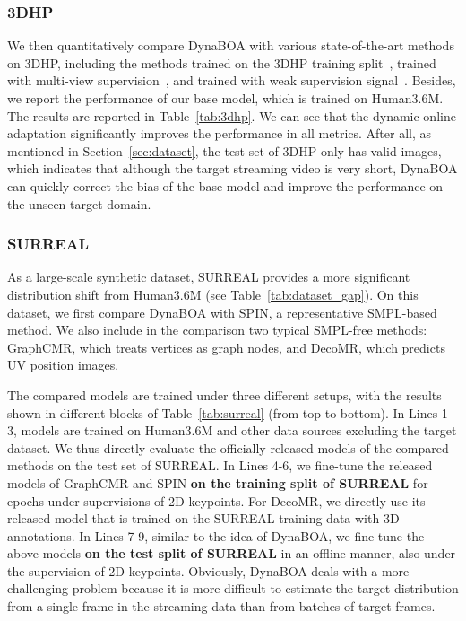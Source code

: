 \documentclass[10pt,journal,compsoc]{IEEEtran}
\newcommand{\sect}[1]{Section~\ref{#1}}
\newcommand{\tab}[1]{Table~\ref{#1}}
\begin{document}
\subsubsection{3DHP} 
We then quantitatively compare DynaBOA with various state-of-the-art methods on 3DHP, including the methods trained on the 3DHP training split~\cite{mehta2017monocular,mehta2017vnect,kocabas2019self,kanazawa2018end,kolotouros2019learning}, trained with multi-view supervision~\cite{kocabas2019self}, and trained with weak supervision signal~\cite{zhou2017towards,habibie2019wild}.
Besides, we report the performance of our base model, which is trained on Human3.6M. The results are reported in \tab{tab:3dhp}. 
We can see that the dynamic online adaptation significantly improves the performance in all metrics. 
After all, as mentioned in \sect{sec:dataset}, the test set of 3DHP only has  valid images, which indicates that although the target streaming video is very short, DynaBOA can quickly correct the bias of the base model and improve the performance on the unseen target domain.


\subsubsection{SURREAL}
As a large-scale synthetic dataset, SURREAL provides a more significant distribution shift from Human3.6M (see \tab{tab:dataset_gap}). On this dataset, we first compare DynaBOA with SPIN, a representative SMPL-based method. 
We also include in the comparison two typical SMPL-free methods: GraphCMR, which treats vertices as graph nodes, and DecoMR, which predicts UV position images.


The compared models are trained under three different setups, with the results shown in different blocks of \tab{tab:surreal} (from top to bottom).
In Lines 1-3, models are trained on Human3.6M and other data sources excluding the target dataset. We thus directly evaluate the officially released models of the compared methods on the test set of SURREAL. 
In Lines 4-6, we fine-tune the released models of GraphCMR and SPIN \textbf{on the training split of SURREAL} for  epochs under supervisions of 2D keypoints. For DecoMR, we directly use its released model that is trained on the SURREAL training data with 3D annotations.
In Lines 7-9, similar to the idea of DynaBOA, we fine-tune the above models \textbf{on the test split of SURREAL} in an offline manner, also under the supervision of 2D keypoints. 
Obviously, DynaBOA deals with a more challenging problem because it is more difficult to estimate the target distribution from a single frame in the streaming data than from batches of target frames.
\end{document}
